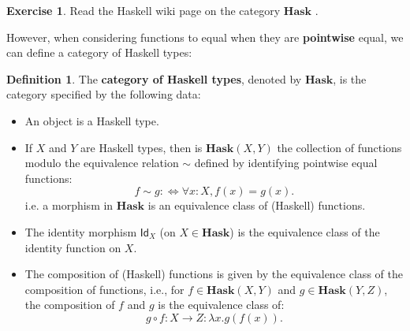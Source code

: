 \documentclass[a4paper,10pt]{scrartcl}
\theoremstyle{plain}
\theoremstyle{definition}
\newtheorem{dfn}[thm]{Definition}
\newtheorem{exer}[thm]{Exercise}
\newcommand{\cfont}[1]{\ensuremath{\mathsf{#1}}}
\newcommand{\Catb}[1]{\mathbf{#1}}
\newcommand{\HASK}{\Catb{Hask}}
\newcommand{\CHom}[3]{{#1}(#2,#3)}
\newcommand{\Id}[1][]{\cfont{Id}_{#1}}
\begin{document}

\begin{exer}
  Read the Haskell wiki page on the category $\HASK$ \cite{haskell-wiki-hask}.
\end{exer}


However, when considering functions to equal when they are \textbf{pointwise} equal, we can define a category of Haskell types:
\begin{dfn}\label{example:hask} The \textbf{category of Haskell types}, denoted by $\HASK$, is the category specified by the following data:
\begin{itemize}
\item An object is a Haskell type.
\item If $X$ and $Y$ are Haskell types, then is $\CHom \HASK X Y$ the collection of functions modulo the equivalence relation $\sim$ defined by identifying pointwise equal functions:
\[
f \sim g :\iff \forall x : X, f(x) = g(x).
\]
i.e. a morphism in $\HASK$ is an equivalence class of (Haskell) functions.
\item The identity morphism $\Id[X]$ (on $X\in\HASK$) is the equivalence class of the identity function on $X$.
\item The composition of (Haskell) functions is given by the equivalence class of the composition of functions, i.e., for $f\in \CHom \HASK X Y$ and $g\in \CHom \HASK Y Z$, the composition of $f$ and $g$ is the equivalence class of:
\[g\circ f : X\to Z: \lambda x. g(f(x)).\]
\end{itemize}
\end{dfn}
\end{document}
